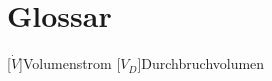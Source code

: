 
\section*{Glossar}
\renewcommand{\baselinestretch}{0.75}\normalsize
\renewcommand{\aclabelfont}[1]{\textsc{\acsfont{#1}}}
\begin{acronym}[longest]
    [$\dot{V}$]{Volumenstrom}
    [$V_D$]{Durchbruchvolumen}
\end{acronym}
\renewcommand{\baselinestretch}{1}\normalsize
